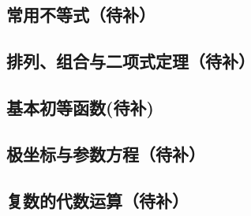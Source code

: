 \documentclass[a4paper, 11pt]{article} %
\begin{document}
\subsection{常用不等式（待补）}
\subsection{排列、组合与二项式定理（待补）}
\subsection{基本初等函数(待补)}
\subsection{极坐标与参数方程（待补）}
\subsection{复数的代数运算（待补）}


\nocite{*}

\end{document}
